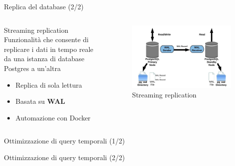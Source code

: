 \begin{frame}{Replica del database (2/2)}

\begin{columns}

\begin{column}{0.45\textwidth}
\begin{block}{Streaming replication}
Funzionalità che consente di replicare i dati in tempo reale da una istanza di database Postgres a un’altra

\begin{itemize}
  \item Replica di sola lettura
  \item Basata su \textbf{WAL}
  \item Automazione con Docker\vspace{0.2cm}
\end{itemize}
\end{block}
\end{column}

\begin{column}{0.55\textwidth}
\begin{figure}[H]
\centering
\captionsetup{justification=centering}
\includegraphics[width=\textwidth]{images/streaming_replication}
\caption{Streaming replication}
\end{figure}
\end{column}

\end{columns}

\end{frame}

\begin{frame}{Ottimizzazione di query temporali (1/2)}
\end{frame}

\begin{frame}{Ottimizzazione di query temporali (2/2)}
\end{frame}

%
%
%
%

